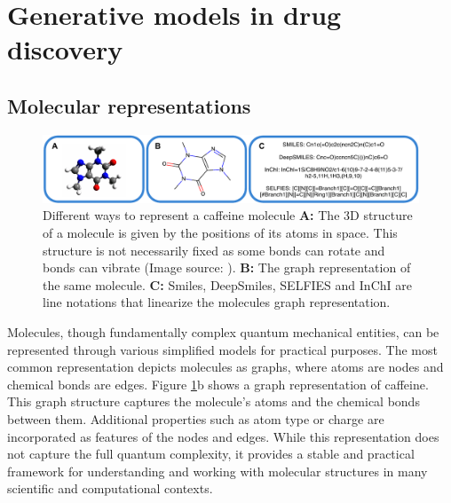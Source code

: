 \section{Generative models in drug discovery}
\subsection{Molecular representations}
\begin{figure}
      \centering
      \includegraphics[width=\textwidth]{figures/representations/representations.pdf}
      \caption{Different ways to represent a caffeine molecule \textbf{A:}  The 3D structure of a
            molecule is given by the positions of its atoms in space. This structure is not
            necessarily fixed as some bonds can rotate and bonds can vibrate (Image source:
            \citep{EnglishCaffeine3D2010}). \textbf{B:} The graph representation of the same
            molecule. \textbf{C:} Smiles, DeepSmiles, SELFIES and InChI are line notations that
            linearize the molecules graph representation.\label{fig:molecular-graph}}
\end{figure}
Molecules, though fundamentally complex quantum mechanical entities, can be represented through
various simplified models for practical purposes. The most common representation depicts molecules
as graphs, where atoms are nodes and chemical bonds are edges. Figure \ref{fig:molecular-graph}b
shows a graph representation of caffeine. This graph structure captures the molecule's atoms
and the chemical bonds between them. Additional properties such as atom type or charge are
incorporated as features of the nodes and edges. While this representation does not capture the full
quantum complexity, it provides a stable and practical framework for understanding and working with
molecular structures in many scientific and computational contexts.

